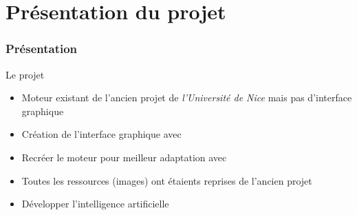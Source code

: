 \section{Présentation du projet}
	\begin{frame}
		\frametitle{Présentation}
		\begin{block}{Le projet}
			\begin{itemize}
				\item Moteur existant de l'ancien projet de \emph{l'Université de Nice} mais pas d'interface graphique
				\item Création de l'interface graphique avec \fx
				\item Recréer le moteur pour meilleur adaptation avec \fx
				\item Toutes les ressources (images) ont étaients reprises de l'ancien projet
				\item Développer l'intelligence artificielle
			\end{itemize}
		\end{block}	
\end{frame}